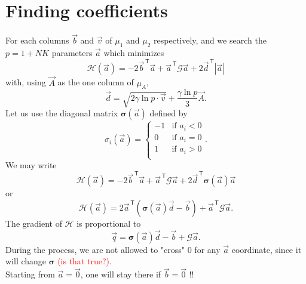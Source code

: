 \documentclass{revtex4}
\newcommand{\abs}[1]{\left|#1\right|}
\newcommand{\trn}[1]{{#1}^{\,\mathsf{T}}}
\begin{document}
\section{Finding coefficients}
For each columns $\vec{b}$ and $\vec{v}$ of $\mu_1$ and $\mu_2$ respectively, and we search the $p=1+NK$ parameters $\vec{a}$ which minimizes
\begin{equation}
	\mathcal{H}\left(\vec{a}\right) = -2\trn{\vec{b}}\vec{a} + \trn{\vec{a}} \mathcal{G} \vec{a} +2 \trn{\vec{d}} \abs{\vec{a}}
\end{equation}
with, using $\vec{A}$ as the one column of $\mu_A$, 
\begin{equation}
	\vec{d} = \sqrt{2\gamma \ln p \cdot \vec{v}} + \dfrac{\gamma\ln p}{3} \vec{A}. 
\end{equation}
Let us use the diagonal matrix 
$\bm{\sigma}\left(\vec{a}\right)$ defined by
\begin{equation}
	\sigma_{i}\left({\vec{a}}\right) = \left\lbrace
	\begin{array}{rl}
	-1 & \text{if $a_i<0$}\\
	0  & \text{if $a_i=0$}\\
	1  & \text{if $a_i>0$}\\
	\end{array}
	\right.
	.
\end{equation}
We may write
\begin{equation}
	\mathcal{H}\left(\vec{a}\right) = -2\trn{\vec{b}}\vec{a} + \trn{\vec{a}} \mathcal{G} \vec{a} + 2 \trn{\vec{d}} \bm{\sigma}\left(\vec{a}\right) \vec{a}
\end{equation}
or
\begin{equation}
	\mathcal{H}\left(\vec{a}\right) = 2\trn{\vec{a}}\left(\bm{\sigma}\left({\vec{a}}\right)\vec{d}-\vec{b}\right) +  \trn{\vec{a}} \mathcal{G} \vec{a}.
\end{equation}
The gradient of
  $\mathcal{H}$  is proportional to
\begin{equation}
	\vec{q} = \bm{\sigma}\left({\vec{a}}\right) \vec{d} -\vec{b} + \mathcal{G} \vec{a}.
\end{equation}
During the process, we are not allowed to "cross" $0$ for any $\vec{a}$ coordinate, since it will change $\bm{\sigma}$ \textcolor{red}{(is that true?)}.\\
Starting from $\vec{a}=\vec{0}$, one will stay there if $\vec{b}=\vec{0}$ !!
 
\end{document}
